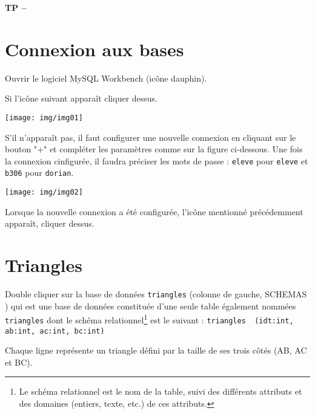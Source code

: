 

%



\begin{center}
{\Large\bf TP \no {\num} -- \descrip}
\end{center}

\section{Connexion aux bases}

Ouvrir le logiciel MySQL Workbench (icône dauphin).

Si l'icône suivant apparaît cliquer dessus.

\begin{center}
\texttt{[image: img/img01]}
\end{center}

S'il n'apparaît pas, il faut configurer une nouvelle connexion en cliquant sur le bouton "+" et compléter les paramètres comme sur la figure ci-dessous. Une fois la connexion cinfigurée, il faudra préciser les mots de passe : \texttt{eleve} pour \texttt{eleve} et \texttt{b306} pour \texttt{dorian}.

\begin{center}
\texttt{[image: img/img02]}
\end{center}

Lorsque la nouvelle connexion a été configurée, l'icône mentionné précédemment apparaît, cliquer dessus.

\section{Triangles}

Double cliquer sur la base de données \verb|triangles| (colonne de gauche, \og SCHEMAS \fg) qui est une base de données constituée d'une seule table également nommées \verb|triangles| dont le schéma relationnel\footnote{Le schéma relationnel est le nom de la table, suivi des différents attributs et des domaines (entiers, texte, etc.) de ces attributs.} est le suivant : \verb|triangles  (idt:int, ab:int, ac:int, bc:int)|

Chaque ligne représente un triangle défini par la taille de ses trois côtés (AB, AC et BC).

